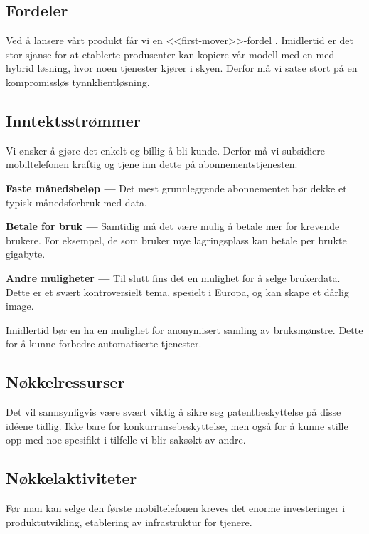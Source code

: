 \subsection*{Fordeler}

Ved å lansere vårt produkt får vi en <<first-mover>>-fordel \cite{bessant}.
Imidlertid er det stor sjanse for at etablerte produsenter kan kopiere vår
modell med en med hybrid løsning, hvor noen tjenester kjører i skyen. Derfor må
vi satse stort på en kompromissløs tynnklientløsning.

\subsection*{Inntektsstrømmer}

Vi ønsker å gjøre det enkelt og billig å bli kunde. Derfor må vi subsidiere
mobiltelefonen kraftig og tjene inn dette på abonnementstjenesten.

\textbf{Faste månedsbeløp --- }
Det mest grunnleggende abonnementet bør dekke et typisk månedsforbruk med data.

\textbf{Betale for bruk --- }
Samtidig må det være mulig å betale mer for krevende brukere. For eksempel, de
som bruker mye lagringsplass kan betale per brukte gigabyte.

\textbf{Andre muligheter --- }
Til slutt fins det en mulighet for å selge brukerdata. Dette er et svært
kontroversielt tema, spesielt i Europa, og kan skape et dårlig image.

Imidlertid bør en ha en mulighet for anonymisert samling av bruksmønstre. Dette
for å kunne forbedre automatiserte tjenester.

\subsection*{Nøkkelressurser}

Det vil sannsynligvis være svært viktig å sikre seg patentbeskyttelse på disse
idéene tidlig. Ikke bare for konkurransebeskyttelse, men også for å kunne
stille opp med noe spesifikt i tilfelle vi blir saksøkt av andre.

\subsection*{Nøkkelaktiviteter}

Før man kan selge den første mobiltelefonen kreves det enorme investeringer i
produktutvikling, etablering av infrastruktur for tjenere.

